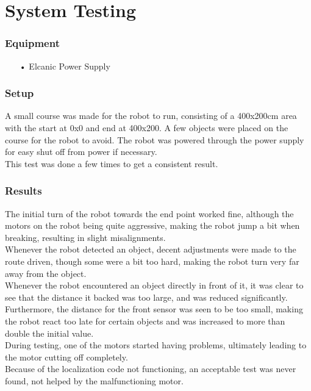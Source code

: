 \section{System Testing}
\subsubsection{Equipment}
\begin{enumerate}
	\item[•]Elcanic Power Supply
\end{enumerate}
\subsubsection{Setup}
A small course was made for the robot to run, consisting of a 400x200cm area with the start at 0x0 and end at 400x200. A few objects were placed on the course for the robot to avoid. The robot was powered through the power supply for easy shut off from power if necessary.\\
This test was done a few times to get a consistent result.
\subsubsection{Results}
The initial turn of the robot towards the end point worked fine, although the motors on the robot being quite aggressive, making the robot jump a bit when breaking, resulting in slight misalignments.\\
Whenever the robot detected an object, decent adjustments were made to the route driven, though some were a bit too hard, making the robot turn very far away from the object.\\ 
Whenever the robot encountered an object directly in front of it, it was clear to see that the distance it backed was too large, and was reduced significantly. Furthermore, the distance for the front sensor was seen to be too small, making the robot react too late for certain objects and was increased to more than double the initial value.\\
During testing, one of the motors started having problems, ultimately leading to the motor cutting off completely.\\
Because of the localization code not functioning, an acceptable test was never found, not helped by the malfunctioning motor. 